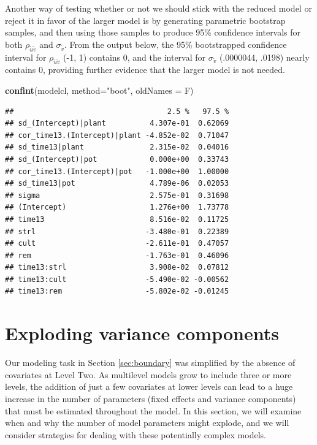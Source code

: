 \documentclass[
]{krantz}
\newenvironment{Shaded}{\begin{snugshade}}{\end{snugshade}}
\newcommand{\DataTypeTok}[1]{\textcolor[rgb]{0.27,0.27,0.27}{#1}}
\newcommand{\KeywordTok}[1]{\textcolor[rgb]{0.27,0.27,0.27}{\textbf{#1}}}
\newcommand{\NormalTok}[1]{#1}
\newcommand{\StringTok}[1]{\textcolor[rgb]{0.5,0.5,0.5}{#1}}
\begin{document}
Another way of testing whether or not we should stick with the reduced model or reject it in favor of the larger model is by generating parametric bootstrap samples, and then using those samples to produce 95\% confidence intervals for both \(\rho_{\tilde{u}\tilde{v}}\) and \(\sigma_{\tilde{v}}\). From the output below, the 95\% bootstrapped confidence interval for \(\rho_{\tilde{u}\tilde{v}}\) (-1, 1) contains 0, and the interval for \(\sigma_{\tilde{v}}\) (.0000044, .0198) nearly contains 0, providing further evidence that the larger model is not needed.

\begin{Shaded}
\begin{Highlighting}[]
\KeywordTok{confint}\NormalTok{(modelcl, }\DataTypeTok{method=}\StringTok{"boot"}\NormalTok{, }\DataTypeTok{oldNames =}\NormalTok{ F)}
\end{Highlighting}
\end{Shaded}

\begin{verbatim}
##                                   2.5 %   97.5 %
## sd_(Intercept)|plant          4.307e-01  0.62069
## cor_time13.(Intercept)|plant -4.852e-02  0.71047
## sd_time13|plant               2.315e-02  0.04016
## sd_(Intercept)|pot            0.000e+00  0.33743
## cor_time13.(Intercept)|pot   -1.000e+00  1.00000
## sd_time13|pot                 4.789e-06  0.02053
## sigma                         2.575e-01  0.31698
## (Intercept)                   1.276e+00  1.73778
## time13                        8.516e-02  0.11725
## strl                         -3.480e-01  0.22389
## cult                         -2.611e-01  0.47057
## rem                          -1.763e-01  0.46096
## time13:strl                   3.908e-02  0.07812
## time13:cult                  -5.490e-02 -0.00562
## time13:rem                   -5.802e-02 -0.01245
\end{verbatim}

\hypertarget{sec:explodingvarcomps}{%
\section{Exploding variance components}\label{sec:explodingvarcomps}}

Our modeling task in Section \ref{sec:boundary} was simplified by the absence of covariates at Level Two. As multilevel models grow to include three or more levels, the addition of just a few covariates at lower levels can lead to a huge increase in the number of parameters (fixed effects and variance components) that must be estimated throughout the model. In this section, we will examine when and why the number of model parameters might explode, and we will consider strategies for dealing with these potentially complex models.
\end{document}
